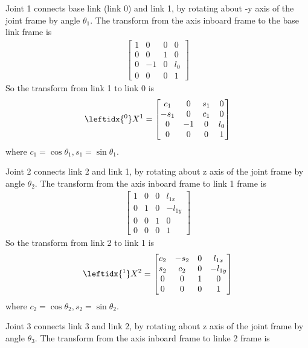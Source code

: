 \documentclass{article}
\begin{document}
Joint 1 connects base link (link 0) and link 1, by rotating about -y axis of the joint frame by angle $\theta_1$. The transform from the axis inboard frame to the base link frame is 
\begin{align}
	\begin{bmatrix}1 & 0 & 0 & 0\\
		       0 & 0 & 1 & 0\\
			0 & -1 & 0 & l_0\\
	               0 & 0 & 0 & 1\end{bmatrix}
\end{align}
So the transform from link 1 to link 0 is
\begin{align}
\leftidx{^0}X^1 = \begin{bmatrix}c_1& 0 & s_1 & 0\\
                                -s_1& 0 & c_1 & 0\\
                                  0 & -1&  0  & l_0\\
                                  0 & 0 &  0  & 1\end{bmatrix}
\end{align}
where $c_1 = \cos\theta_1, s_1=\sin\theta_1$.

Joint 2 connects link 2 and link 1, by rotating about  z axis of the joint frame by angle $\theta_2$. The transform from the axis inboard frame to link 1 frame is
\begin{align}
	\begin{bmatrix}
		1 & 0 & 0 & l_{1x}\\
		0 & 1 & 0 & -l_{1y}\\
		0 & 0 & 1 & 0\\
		0 & 0 & 0 & 1
	\end{bmatrix}
\end{align}
So the transform from link 2 to link 1 is
\begin{align}
\leftidx{^1}X^2 = \begin{bmatrix}
	c_2 & -s_2 & 0  & l_{1x}\\
	s_2 & c_2  & 0  & -l_{1y}\\
	0   &  0   & 1  & 0\\
	0   & 0    & 0  & 1
		\end{bmatrix}
\end{align}
where $c_2 = \cos\theta_2, s_2 = \sin\theta_2$.

Joint 3 connects link 3 and link 2, by rotating about z axis of the joint frame by angle $\theta_3$. The transform from the axis inboard frame to linke 2 frame is
\end{document}
